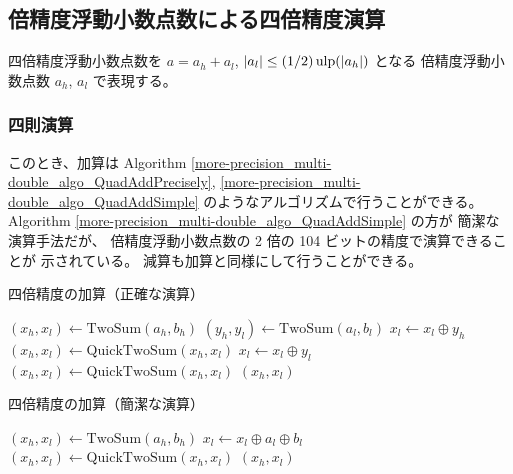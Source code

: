 \clearpage

\subsection{倍精度浮動小数点数による四倍精度演算}

四倍精度浮動小数点数を $a = a_h + a_l$, $|a_l| \le (1/2) \operatorname{ulp}(|a_h|)$ となる
倍精度浮動小数点数 $a_h$, $a_l$ で表現する。

\subsubsection{四則演算}

このとき、加算は
Algorithm \ref{more-precision_multi-double_algo_QuadAddPrecisely},
\ref{more-precision_multi-double_algo_QuadAddSimple}
のようなアルゴリズムで行うことができる。
Algorithm \ref{more-precision_multi-double_algo_QuadAddSimple} の方が
簡潔な演算手法だが、
倍精度浮動小数点数の 2 倍の 104 ビットの精度で演算できることが
示されている\cite{Naoya2012}。
減算も加算と同様にして行うことができる。

\begin{algorithm}[tp]
    \caption{四倍精度の加算（正確な演算）\cite{Hisashi2006}}
    \label{more-precision_multi-double_algo_QuadAddPrecisely}
    \begin{algorithmic}
        \State $(x_h, x_l) \gets \text{TwoSum}(a_h, b_h)$
        \State $(y_h, y_l) \gets \text{TwoSum}(a_l, b_l)$
        \State $x_l \gets x_l \oplus y_h$
        \State $(x_h, x_l) \gets \text{QuickTwoSum}(x_h, x_l)$
        \State $x_l \gets x_l \oplus y_l$
        \State $(x_h, x_l) \gets \text{QuickTwoSum}(x_h, x_l)$
        \State \Return $(x_h, x_l)$
        \EndProcedure
    \end{algorithmic}
\end{algorithm}

\begin{algorithm}[tp]
    \caption{四倍精度の加算（簡潔な演算）\cite{Naoya2012,Hirayama2014}}
    \label{more-precision_multi-double_algo_QuadAddSimple}
    \begin{algorithmic}
        \State $(x_h, x_l) \gets \text{TwoSum}(a_h, b_h)$
        \State $x_l \gets x_l \oplus a_l \oplus b_l$
        \State $(x_h, x_l) \gets \text{QuickTwoSum}(x_h, x_l)$
        \State \Return $(x_h, x_l)$
        \EndProcedure
    \end{algorithmic}
\end{algorithm}

